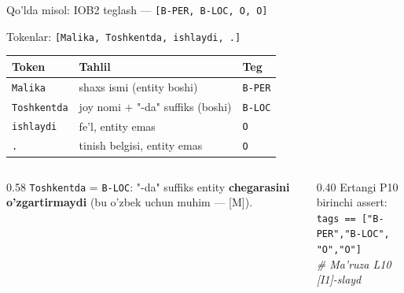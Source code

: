 \documentclass[aspectratio=169,11pt]{beamer}
\begin{document}
%
\begin{frame}{Qo'lda misol: IOB2 teglash --- \texttt{[B-PER, B-LOC, O, O]}}
  \begin{tcolorbox}[defbox,title={Gap: "Malika Toshkentda ishlaydi ."}]
    \small Tokenlar: \texttt{[Malika, Toshkentda, ishlaydi, .]}
  \end{tcolorbox}
  \vspace{0.3em}
  \begin{center}\small
  \begin{tabular}{l l l}
    \toprule
    \textbf{Token} & \textbf{Tahlil} & \textbf{Teg} \\
    \midrule
    \texttt{Malika}     & shaxs ismi (entity boshi)            & \texttt{B-PER} \\
    \texttt{Toshkentda} & joy nomi $+$ "-da" suffiks (boshi)   & \texttt{B-LOC} \\
    \texttt{ishlaydi}   & fe'l, entity emas                    & \texttt{O} \\
    \texttt{.}          & tinish belgisi, entity emas          & \texttt{O} \\
    \bottomrule
  \end{tabular}
  \end{center}
  \vspace{2pt}
  \begin{columns}[T]
    \begin{column}{0.58\textwidth}
      \footnotesize \texttt{Toshkentda} = \texttt{B-LOC}: "-da" suffiks entity
      \textbf{chegarasini o'zgartirmaydi} (bu o'zbek uchun muhim --- [M]).
    \end{column}
    \begin{column}{0.40\textwidth}
      \footnotesize\color{halfgray}
      Ertangi P10 birinchi assert:\\
      \texttt{tags == ["B-PER","B-LOC",}\\
      \texttt{\phantom{xx}"O","O"]}\\
      \textit{\# Ma'ruza L10 [I1]-slayd}
    \end{column}
  \end{columns}
\end{frame}
\end{document}
